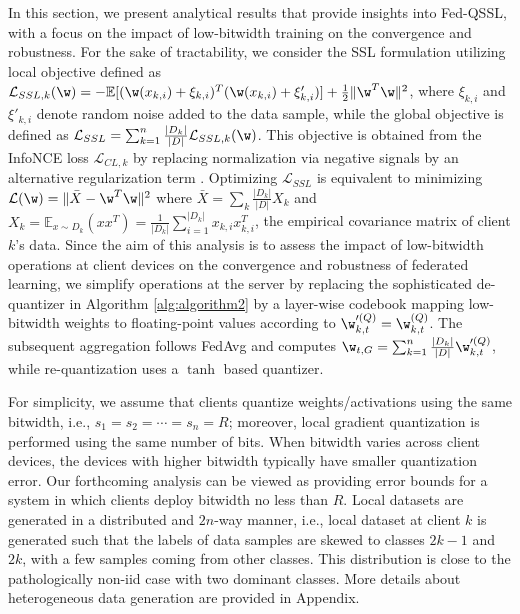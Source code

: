 
In this section, we present analytical results that provide insights into Fed-QSSL, with a focus on the impact of low-bitwidth training on the convergence and robustness. For the sake of tractability, we consider the SSL formulation utilizing local objective defined as $\mathcal{L}_{SSL,k}(\w) = -\mathbb{E}[(\w(x_{k, i}) +\xi_{k, i})^T(\w(x_{k, i}) +\xi'_{k, i})] + \frac{1}{2} \|\w^T \w \|^2 $, where $\xi_{k, i}$ and $\xi'_{k, i}$ denote random noise added to the data sample, while the global objective is defined as $\mathcal{L}_{SSL} = \sum_{k=1}^n \frac{|D_k|}{|D|}\mathcal{L}_{SSL, k}(\w)$.
This objective is obtained from the InfoNCE loss $\mathcal{L}_{CL, k}$ by replacing normalization via negative signals by an alternative regularization term \cite{wang2022does}. Optimizing $\mathcal{L}_{SSL}$ is equivalent to minimizing $\mathcal{L}(\w) = \|\bar{X} - \w^T \w \|^2$ where $\bar{X} = \sum_k \frac{|D_k|}{|D|}X_k$ and $X_k = \mathbb{E}_{x \sim D_k}(xx^T) = \frac{1}{|D_k|}\sum_{i=1}^{|D_k|} x_{k, i}x_{k, i}^T$, the empirical covariance matrix of client $k$'s data. Since the aim of this analysis is to assess the impact of low-bitwidth operations at client devices on the convergence and robustness of federated learning, we simplify operations at the server by replacing the sophisticated de-quantizer in Algorithm \ref{alg:algorithm2} by a layer-wise codebook mapping low-bitwidth weights to floating-point values according to $\w'^{(Q)}_{k, t} = \w^{(Q)}_{k, t}$. The subsequent aggregation follows FedAvg and computes $\w_{t, G} = \sum_{k=1}^n \frac{|D_k|}{|D|} \w'^{(Q)}_{k, t}$, while re-quantization uses a $\tanh$ based quantizer.

For simplicity, we assume that clients quantize weights/activations using the same bitwidth, i.e., $s_1 = s_2 = \cdots = s_n = R$; moreover, local gradient quantization is performed using the same number of bits. When bitwidth varies across client devices, the devices with higher bitwidth typically have smaller quantization error. Our forthcoming analysis can be viewed as providing error bounds for a system in which clients deploy bitwidth no less than $R$. Local datasets are generated in a distributed and $2n$-way manner, i.e., local dataset at client $k$ is generated such that the labels of data samples are skewed to classes $2k-1$ and $2k$, with a few samples coming from other classes. This distribution is close to the pathologically non-iid case with two dominant classes. More details about heterogeneous data generation are provided in Appendix.

